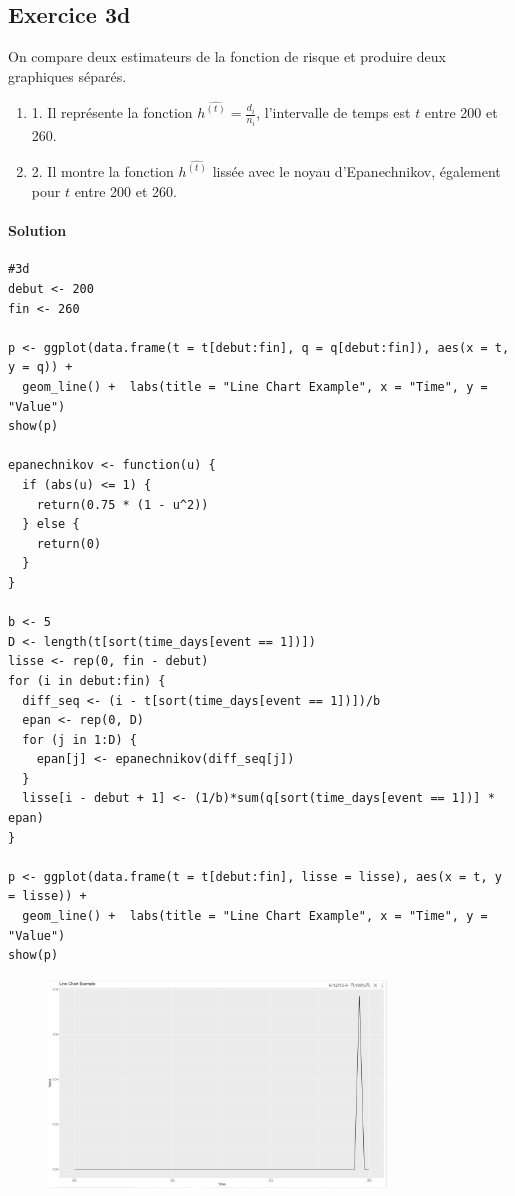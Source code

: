 \documentclass[../main.tex]{subfiles}
\begin{document}
\begin{CJK*}{UTF8}{gbsn}

\section*{Exercice 3d}
On compare deux estimateurs de la fonction de risque et produire deux graphiques séparés.
\begin{enumerate}
  \item1. Il représente la fonction $h^\hat{(t)} = \frac{d_i}{n_i}$, l'intervalle de temps est $t$ entre 200 et 260.
  \item2. Il montre la fonction $h^\hat{(t)}$ lissée avec le noyau d'Epanechnikov, également pour $t$ entre 200 et 260.
\end{enumerate}

\paragraph{Solution}

\begin{lstlisting}
#3d
debut <- 200
fin <- 260

p <- ggplot(data.frame(t = t[debut:fin], q = q[debut:fin]), aes(x = t, y = q)) +
  geom_line() +  labs(title = "Line Chart Example", x = "Time", y = "Value")
show(p)

epanechnikov <- function(u) {
  if (abs(u) <= 1) {
    return(0.75 * (1 - u^2))
  } else {
    return(0)
  }
}

b <- 5
D <- length(t[sort(time_days[event == 1])])
lisse <- rep(0, fin - debut)
for (i in debut:fin) {
  diff_seq <- (i - t[sort(time_days[event == 1])])/b
  epan <- rep(0, D)
  for (j in 1:D) {
    epan[j] <- epanechnikov(diff_seq[j])
  }
  lisse[i - debut + 1] <- (1/b)*sum(q[sort(time_days[event == 1])] * epan)
}

p <- ggplot(data.frame(t = t[debut:fin], lisse = lisse), aes(x = t, y = lisse)) +
  geom_line() +  labs(title = "Line Chart Example", x = "Time", y = "Value")
show(p)

\end{lstlisting}

\begin{figure}[H]
  \centering
  \includegraphics[width=0.8\textwidth]{3D2.JPG}
  \label{fig:mesh1}
\end{figure}


\end{CJK*}
\end{document}
